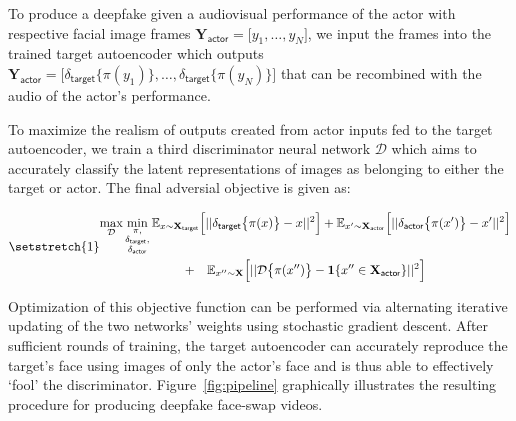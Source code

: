 \documentclass[12pt,letterpaper]{article}
\begin{document}
\noindent To produce a deepfake given a audiovisual performance of the actor with respective facial image frames $\mathbf{Y}_{\textsf{actor}} = \Big[y_1, \ldots, y_N \Big]$, we input the frames into the trained target autoencoder which outputs $\mathbf{Y}_{\textsf{actor}} = \Big[\delta_{\textsf{target}}\big\{\pi(y_1)\}, \ldots, \delta_{\textsf{target}}\big\{\pi(y_N)\}\Big]$ that can be recombined with the audio of the actor's performance.

To maximize the realism of outputs created from actor inputs fed to the target autoencoder, we train a third discriminator neural network $\mathcal{D}$ which aims to accurately classify the latent representations of images as belonging to either the target or actor. The final adversial objective is given as:

\begin{equation}\label{adversarial_loss}
\setstretch{1}
\begin{gathered}
\max_{\mathcal{D}} \min_{ \substack{\pi, \\ \delta_{\textsf{target}}, \\ \delta_{\textsf{actor}} } } \mathbb{E}_{x \sim \mathbf{X}_{\textsf{target}} }\Big[ || \delta_{\textsf{target}} \big\{\pi(x) \big\} - x ||^2 \Big] + \mathbb{E}_{x^\prime \sim \mathbf{X}_{\textsf{actor}} }\Big[ || \delta_{\textsf{actor}} \big\{\pi(x^\prime) \big\} - x^\prime ||^2 \Big] \\ + \quad \mathbb{E}_{x^{\prime\prime} \sim \mathbf{X} }\Big[ ||\mathcal{D}\big\{ \pi(x^{\prime\prime})\big\} - \mathbf{1}\{ x^{\prime\prime} \in \mathbf{X}_{\textsf{actor}} \}||^2 \Big]
\end{gathered}
\end{equation}

\noindent Optimization of this objective function can be performed via alternating iterative updating of the two networks' weights using stochastic gradient descent. After sufficient rounds of training, the target autoencoder can accurately reproduce the target's face using images of only the actor's face and is thus able to effectively `fool' the discriminator. Figure~\ref{fig:pipeline} graphically illustrates the resulting  procedure for producing deepfake face-swap videos.
\end{document}
